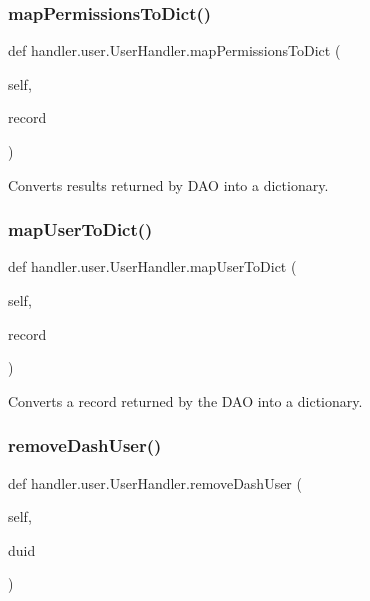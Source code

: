 \subsubsection{\texorpdfstring{map\+Permissions\+To\+Dict()}{mapPermissionsToDict()}}
{\footnotesize\ttfamily def handler.\+user.\+User\+Handler.\+map\+Permissions\+To\+Dict (\begin{DoxyParamCaption}\item[{}]{self,  }\item[{}]{record }\end{DoxyParamCaption})}

\begin{DoxyVerb}Converts results returned by DAO into a dictionary.
\end{DoxyVerb}
 \mbox{\label{classhandler_1_1user_1_1_user_handler_a563bf510a65aefcc2d6988d18fce087f}} 
\subsubsection{\texorpdfstring{map\+User\+To\+Dict()}{mapUserToDict()}}
{\footnotesize\ttfamily def handler.\+user.\+User\+Handler.\+map\+User\+To\+Dict (\begin{DoxyParamCaption}\item[{}]{self,  }\item[{}]{record }\end{DoxyParamCaption})}

\begin{DoxyVerb}Converts a record returned by the DAO into a dictionary.
\end{DoxyVerb}
 \mbox{\label{classhandler_1_1user_1_1_user_handler_ac698bb4b5305f31845db90f0932e95ad}} 
\subsubsection{\texorpdfstring{remove\+Dash\+User()}{removeDashUser()}}
{\footnotesize\ttfamily def handler.\+user.\+User\+Handler.\+remove\+Dash\+User (\begin{DoxyParamCaption}\item[{}]{self,  }\item[{}]{duid }\end{DoxyParamCaption})}

